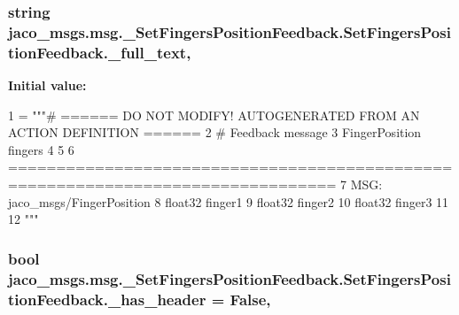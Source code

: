 \subsubsection[{\texorpdfstring{\+\_\+full\+\_\+text}{_full_text}}]{\setlength{\rightskip}{0pt plus 5cm}string jaco\+\_\+msgs.\+msg.\+\_\+\+Set\+Fingers\+Position\+Feedback.\+Set\+Fingers\+Position\+Feedback.\+\_\+full\+\_\+text\hspace{0.3cm}{\ttfamily [static]}, {\ttfamily [private]}}\hypertarget{classjaco__msgs_1_1msg_1_1__SetFingersPositionFeedback_1_1SetFingersPositionFeedback_a1ba86f8e6d822ebd44f54a4fc7f01418}{}\label{classjaco__msgs_1_1msg_1_1__SetFingersPositionFeedback_1_1SetFingersPositionFeedback_a1ba86f8e6d822ebd44f54a4fc7f01418}
{\bfseries Initial value\+:}
\begin{DoxyCode}
1 = \textcolor{stringliteral}{"""# ====== DO NOT MODIFY! AUTOGENERATED FROM AN ACTION DEFINITION ======}
2 \textcolor{stringliteral}{# Feedback message}
3 \textcolor{stringliteral}{FingerPosition fingers}
4 \textcolor{stringliteral}{}
5 \textcolor{stringliteral}{}
6 \textcolor{stringliteral}{================================================================================}
7 \textcolor{stringliteral}{MSG: jaco\_msgs/FingerPosition}
8 \textcolor{stringliteral}{float32 finger1}
9 \textcolor{stringliteral}{float32 finger2}
10 \textcolor{stringliteral}{float32 finger3}
11 \textcolor{stringliteral}{}
12 \textcolor{stringliteral}{"""}
\end{DoxyCode}
\subsubsection[{\texorpdfstring{\+\_\+has\+\_\+header}{_has_header}}]{\setlength{\rightskip}{0pt plus 5cm}bool jaco\+\_\+msgs.\+msg.\+\_\+\+Set\+Fingers\+Position\+Feedback.\+Set\+Fingers\+Position\+Feedback.\+\_\+has\+\_\+header = False\hspace{0.3cm}{\ttfamily [static]}, {\ttfamily [private]}}\hypertarget{classjaco__msgs_1_1msg_1_1__SetFingersPositionFeedback_1_1SetFingersPositionFeedback_a1d74b76cfeafbada370c271881784655}{}\label{classjaco__msgs_1_1msg_1_1__SetFingersPositionFeedback_1_1SetFingersPositionFeedback_a1d74b76cfeafbada370c271881784655}
